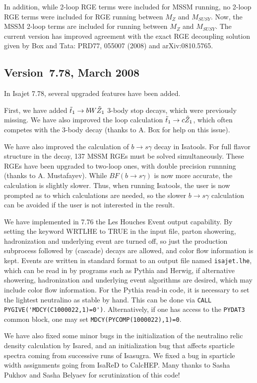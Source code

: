 In addition, while 2-loop RGE terms were included for MSSM running,
no 2-loop RGE terms were included for RGE running between 
$M_Z$ and $M_{SUSY}$. Now, the MSSM 2-loop terms are included for
running between $M_Z$ and $M_{SUSY}$. The current version has improved agreement with the exact RGE decoupling solution given by Box and Tata:
PRD77, 055007 (2008) and arXiv:0810.5765.

\subsection{Version~7.78, March 2008}

In Isajet 7.78, several upgraded features have been added.

First, we have added $\tilde{t}_1\rightarrow bW\tilde Z_1$ 3-body stop decays,
which were previously missing. We have also improved the loop calculation 
$\tilde{t}_1\rightarrow c\tilde Z_1$, which often competes with the 3-body decay
(thanks to A. Box for help on this issue).

We have also improved the calculation of $b\rightarrow s\gamma$ decay in Isatools.
For full flavor structure in the decay, 137 MSSM RGEs must be solved simultaneously. 
These RGEs have been upgraded to two-loop ones, with double precision runnning
(thanks to A. Mustafayev).
While $BF(b\rightarrow s\gamma )$ is now more accurate, the calculation is 
slightly slower. Thus, when running Isatools, the user is now prompted 
as to which calculations are needed, so the slower $b\rightarrow s\gamma$ calculation 
can be avoided if the user is not interested in the result.

We have implemented in 7.76 the Les Houches Event output capability. 
By setting  the keyword WRTLHE to TRUE in the input file, parton showering,
hadronization and underlying event are turned off, so just the production
subprocess followed by (cascade) decays are allowed, and color flow information is
kept. Events are written in standard format to an output file named \verb|isajet.lhe|,
which can be read in by programs such as Pythia and Herwig, if alternative 
showering, hadronization and underlying event algorithms are desired, which may include 
color flow information.
For the Pythia read-in code, it is necessary to set the lightest neutralino
as stable by hand. This can be done via \verb|CALL PYGIVE('MDCY(C1000022,1)=0')|. 
Alternatively, if one has access to the \verb|PYDAT3| common block, one may set 
\verb|MDCY(PYCOMP(1000022),1)=0|.

We have also fixed some minor bugs in the initialization of the neutralino relic density 
calculation by Isared, and an initialization bug that affects sparticle spectra 
coming from successive runs of Isasugra.
We fixed a bug in sparticle width assignments going from IsaReD to CalcHEP.
Many thanks to Sasha Pukhov and Sasha Belyaev for scrutinization of this code!

